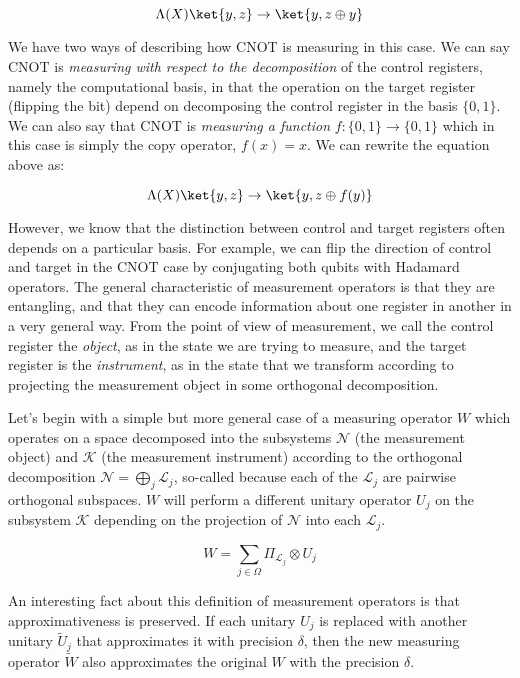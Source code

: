 \documentclass{article}
\theoremstyle{definition} \newtheorem{lemma}{Lemma}
\theoremstyle{definition} \newtheorem{theorem}{Theorem}
\begin{document}
\begin{equation}
\Lambda(X)\ket{y,z} \rightarrow \ket{y, z \oplus y}
\end{equation}

We have two ways of describing how CNOT is measuring in this case.
We can say CNOT is \emph{measuring with respect to the decomposition} of
the control registers, namely the computational basis, in that the
operation on the target register (flipping the bit) depend on decomposing the
control register in the basis $\{0,1\}$. We can also say that CNOT is
\emph{measuring a function} $f:\{0,1\} \rightarrow \{0,1\}$ which in this
case is simply the copy operator, $f(x) = x$. We can rewrite the equation
above as:

\begin{equation}
\Lambda(X)\ket{y,z} \rightarrow \ket{y, z \oplus f(y)}
\end{equation}

However, we know that the distinction between control and target registers
often depends on a particular basis. For example, we can flip the direction
of control and target in the CNOT case by conjugating both qubits with
Hadamard operators. The general characteristic of measurement operators
is that they are entangling, and that they can encode information about
one register in another in a very general way.
From the point of view of measurement, we call the control register the
\emph{object}, as in the state we are trying to measure, and the target register
is the \emph{instrument}, as in the state that we transform according to
projecting the measurement object in some orthogonal decomposition.

Let's begin with a simple but more general case of a measuring operator
$W$ which operates on a space decomposed into the subsystems $\mathcal{N}$
(the measurement object) and $\mathcal{K}$ (the measurement instrument)
according to the orthogonal decomposition
$\mathcal{N} = \bigoplus_j \mathcal{L}_j$, so-called because
each of the $\mathcal{L}_j$ are pairwise orthogonal subspaces.
$W$ will perform a different unitary
operator $U_j$ on the subsystem $\mathcal{K}$
depending on the projection of $\mathcal{N}$ into each $\mathcal{L}_j$.

\begin{equation}
W = \sum_{j \in \Omega} \Pi_{\mathcal{L}_j} \otimes U_j
\end{equation}

An interesting fact about this definition of measurement operators is
that approximativeness is preserved. If each unitary $U_j$ is replaced with
another unitary $\tilde{U}_j$ that approximates it with precision $\delta$,
then the new measuring operator $\tilde{W}$ also approximates the original
$W$ with the precision $\delta$.
\end{document}
